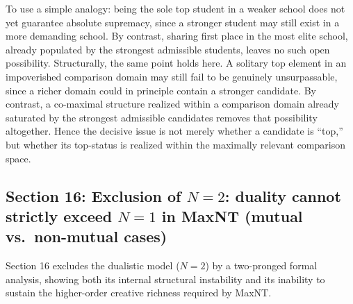 \documentclass[a4paper, 11pt]{article}
\theoremstyle{plain}
\theoremstyle{definition}
\begin{document}
To use a simple analogy: being the sole top student in a weaker school does not yet guarantee absolute supremacy, since a stronger student may still exist in a more demanding school. By contrast, sharing first place in the most elite school, already populated by the strongest admissible students, leaves no such open possibility. Structurally, the same point holds here. A solitary top element in an impoverished comparison domain may still fail to be genuinely unsurpassable, since a richer domain could in principle contain a stronger candidate. By contrast, a co-maximal structure realized within a comparison domain already saturated by the strongest admissible candidates removes that possibility altogether. Hence the decisive issue is not merely whether a candidate is ``top,'' but whether its top-status is realized within the maximally relevant comparison space.

\subsection{Section 16: Exclusion of \(N=2\): duality cannot strictly exceed \(N=1\) in MaxNT (mutual vs.\ non-mutual cases)}
\label{sec:paircollapse}

Section 16 excludes the dualistic model (\(N=2\)) by a two-pronged formal analysis, showing both its internal structural instability and its inability to sustain the higher-order creative richness required by MaxNT.
\end{document}
